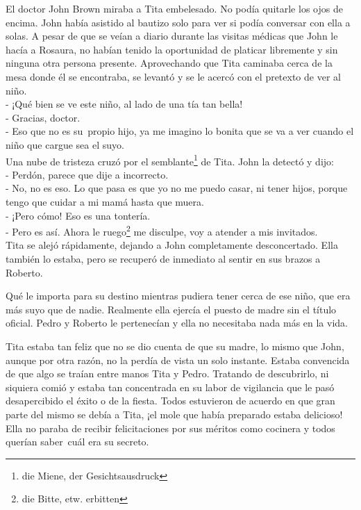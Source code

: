El doctor John Brown miraba a Tita embelesado. No podía quitarle los
ojos de encima. John había asistido al bautizo solo para ver si podía
conversar con ella a solas. A pesar de que se veían a diario durante las
visitas médicas que John le hacía a Rosaura, no habían tenido la
oportunidad de platicar libremente y sin ninguna otra persona presente.
Aprovechando que Tita caminaba cerca de la mesa donde él se encontraba,
se levantó y se le acercó con el pretexto de ver al niño.
\\- ¡Qué bien se ve este niño, al lado de una tía tan bella! %
\\- Gracias, doctor. %
\\- Eso que no es su~propio hijo, ya me imagino lo bonita que se va a %
ver cuando el niño que cargue sea el suyo.\\

Una nube de tristeza cruzó por el semblante\footnote{die Miene, der Gesichtsausdruck}
de Tita. John la detectó y dijo:
\\- Perdón, parece que dije a incorrecto. %
\\- No, no es eso. Lo que pasa es que yo no me puedo casar, ni tener %
hijos, porque tengo que cuidar a mi mamá hasta que muera. %
\\- ¡Pero cómo! Eso es una tontería. %
\\- Pero es así. Ahora le ruego\footnote{die Bitte, etw. erbitten} %
me disculpe, voy a atender a mis invitados.\\

Tita se alejó rápidamente, dejando a John completamente desconcertado.
Ella también lo estaba, pero se recuperó de inmediato al sentir en sus
brazos a Roberto.

Qué le importa para su destino mientras pudiera tener cerca de ese
niño, que era más suyo que de nadie. Realmente ella ejercía el puesto de
madre sin el título oficial. Pedro y Roberto le pertenecían y ella no
necesitaba nada más en la vida.

Tita estaba tan feliz que no se dio cuenta de que su madre, lo mismo
que John, aunque por otra razón, no la perdía de vista un solo instante.
Estaba convencida de que algo se traían entre manos Tita y Pedro.
Tratando de descubrirlo, ni siquiera comió y estaba tan concentrada en
su labor de vigilancia que le pasó desapercibido el éxito o de la
fiesta. Todos estuvieron de acuerdo en que gran parte del mismo se debía
a Tita, ¡el mole que había preparado estaba delicioso! Ella no paraba de
recibir felicitaciones por sus méritos como cocinera y todos querían
saber~cuál era su secreto.

